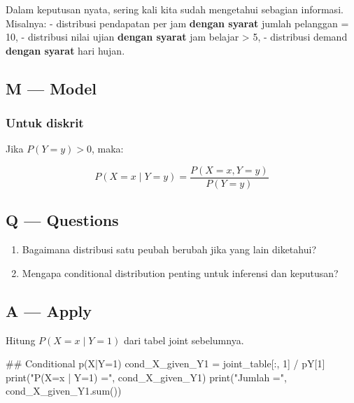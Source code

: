 \documentclass[
  letterpaper,
  DIV=11,
  numbers=noendperiod]{scrreprt}
\newenvironment{Shaded}{\begin{snugshade}}{\end{snugshade}}
\newcommand{\BuiltInTok}[1]{\textcolor[rgb]{0.00,0.23,0.31}{#1}}
\newcommand{\CommentTok}[1]{\textcolor[rgb]{0.37,0.37,0.37}{#1}}
\newcommand{\DecValTok}[1]{\textcolor[rgb]{0.68,0.00,0.00}{#1}}
\newcommand{\NormalTok}[1]{\textcolor[rgb]{0.00,0.23,0.31}{#1}}
\newcommand{\OperatorTok}[1]{\textcolor[rgb]{0.37,0.37,0.37}{#1}}
\newcommand{\StringTok}[1]{\textcolor[rgb]{0.13,0.47,0.30}{#1}}
\providecommand{\tightlist}{%
  \setlength{\itemsep}{0pt}\setlength{\parskip}{0pt}}
\begin{document}
Dalam keputusan nyata, sering kali kita sudah mengetahui sebagian
informasi. Misalnya: - distribusi pendapatan per jam \textbf{dengan
syarat} jumlah pelanggan = 10, - distribusi nilai ujian \textbf{dengan
syarat} jam belajar \textgreater{} 5, - distribusi demand \textbf{dengan
syarat} hari hujan.

\subsection{M --- Model}\label{m-model-33}

\subsubsection{Untuk diskrit}\label{untuk-diskrit-3}

Jika \(P(Y=y)>0\), maka:

\[
P(X=x \mid Y=y)=\frac{P(X=x, Y=y)}{P(Y=y)}
\]

\subsection{Q --- Questions}\label{q-questions-33}

\begin{enumerate}
\def\labelenumi{\arabic{enumi}.}
\tightlist
\item
  Bagaimana distribusi satu peubah berubah jika yang lain diketahui?
\item
  Mengapa conditional distribution penting untuk inferensi dan
  keputusan?
\end{enumerate}

\subsection{A --- Apply}\label{a-apply-32}

Hitung \(P(X=x \mid Y=1)\) dari tabel joint sebelumnya.

\begin{Shaded}
\begin{Highlighting}[]
\CommentTok{\#\# Conditional p(X|Y=1)}
\NormalTok{cond\_X\_given\_Y1 }\OperatorTok{=}\NormalTok{ joint\_table[:, }\DecValTok{1}\NormalTok{] }\OperatorTok{/}\NormalTok{ pY[}\DecValTok{1}\NormalTok{]}
\BuiltInTok{print}\NormalTok{(}\StringTok{"P(X=x | Y=1) ="}\NormalTok{, cond\_X\_given\_Y1)}
\BuiltInTok{print}\NormalTok{(}\StringTok{"Jumlah ="}\NormalTok{, cond\_X\_given\_Y1.}\BuiltInTok{sum}\NormalTok{())}
\end{Highlighting}
\end{Shaded}
\end{document}
